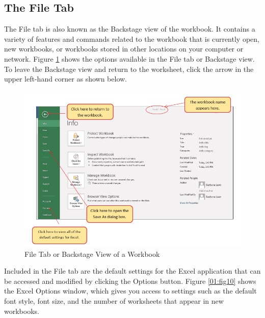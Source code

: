 \subsection{The File Tab}

The File tab is also known as the Backstage view of the workbook. It contains a variety of features and commands related to the workbook that is currently open, new workbooks, or workbooks stored in other locations on your computer or network. Figure \ref{01:fig09} shows the options available in the File tab or Backstage view. To leave the Backstage view and return to the worksheet, click the arrow in the upper left-hand corner as shown below.

\begin{figure}[H]
	\centering
	\includegraphics[width=\maxwidth{.95\linewidth}]{gfx/ch01_fig09}
	\caption{File Tab or Backstage View of a Workbook}
	\label{01:fig09}
\end{figure}

Included in the File tab are the default settings for the Excel application that can be accessed and modified by clicking the Options button. Figure \ref{01:fig10} shows the Excel Options window, which gives you access to settings such as the default font style, font size, and the number of worksheets that appear in new workbooks.

